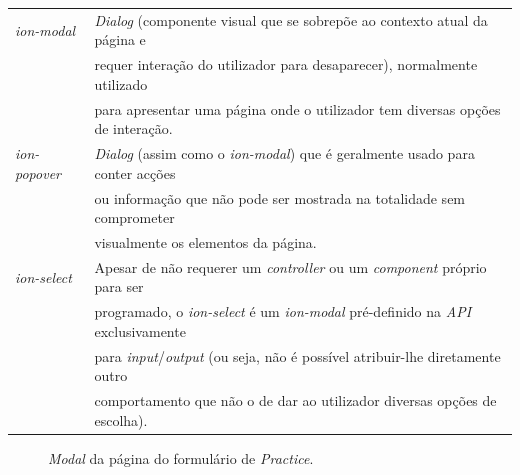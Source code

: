 \begin{tabular}{ll}
	\textit{ion-modal} & \textit{Dialog} (componente visual que se sobrepõe ao contexto atual da página e \\
	&requer interação do utilizador para desaparecer), normalmente utilizado \\
	&para apresentar uma página onde o utilizador tem diversas opções de interação.
	\\
	\textit{ion-popover} & \textit{Dialog} (assim como o \textit{ion-modal}) que é geralmente usado para conter acções \\
	&ou informação que não pode ser mostrada na totalidade sem comprometer\\
	& visualmente os elementos da página.
	\\
	\textit{ion-select} & Apesar de não requerer um \textit{controller} ou um \textit{component} próprio para ser \\
	&programado, o \textit{ion-select} é um \textit{ion-modal} pré-definido na \textit{API} exclusivamente \\
	&para \textit{input}/\textit{output} (ou seja, não é possível atribuir-lhe diretamente outro \\
	&comportamento que não o de dar ao utilizador diversas opções de escolha).
\end{tabular}

\begin{figure}[h]
	\begin{center}
	\end{center}
	\caption{\textit{Modal} da página do formulário de \textit{Practice}.}\label{fig:practiceformmodal}
\end{figure}
\newpage

